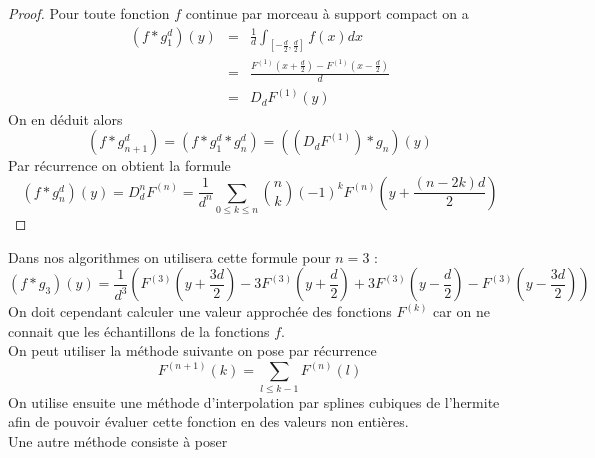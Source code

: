 \begin{proof}
Pour toute fonction $f$ continue par morceau à support compact on a 
\begin{eqnarray*}
(f * g_1^d )(y)&=&\frac{1}{d} \int_{[-\frac{d}{2},\frac{d}{2}]} f(x) dx\\
               &=&\frac{F^{(1)}(x+\frac{d}{2})-F^{(1)}(x-\frac{d}{2})}{d}\\
               &=&D_d F^{(1)}(y)
\end{eqnarray*}
On en déduit alors 
\begin{equation*}
(f*g_{n+1}^{d})=(f*g_1^d * g_{n}^{d})= ((D_d F^{(1)})*g_n )(y)
\end{equation*}
Par récurrence on obtient la formule 
\begin{equation*}
(f*g_n^d)(y)=D_d ^n F^{(n)}= \frac{1}{d^n}\underset{0 \le k\le n}{\sum} \binom{n}{k}(-1)^{k} F^{(n)}(y+\frac{(n-2k)d}{2})
\end{equation*}

\end{proof}
Dans nos algorithmes  on utilisera cette formule pour $n=3$ :
\begin{equation*}
(f*g_3)(y)=\frac{1}{d^3}(F^{(3)}(y+\frac{3d}{2})-3F^{(3)}(y+\frac{d}{2})+3F^{(3)}(y-\frac{d}{2})-F^{(3)}(y-\frac{3d}{2}))
\end{equation*}
On doit cependant calculer une valeur approchée des fonctions $F^{(k)}$  car on ne connait que les échantillons de la fonctions $f$.\\
On peut utiliser la méthode suivante on pose par récurrence
\begin{equation*}
F^{(n+1)}(k)=\underset{l\le k-1}{\sum}F^{(n)}(l)
\end{equation*}
On utilise ensuite une méthode d'interpolation par splines cubiques de l'hermite afin de pouvoir évaluer cette fonction en des valeurs non entières.\\
Une autre méthode consiste à poser 


